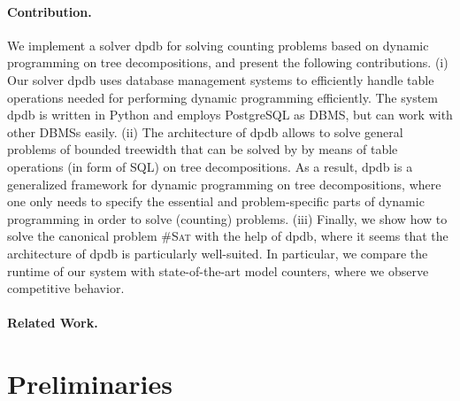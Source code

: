 \documentclass{llncs}
\newcommand{\cSAT}{\textsc{\#Sat}\xspace}%
\newcommand{\dpdb}{{\small\textsf{dpdb}}\xspace}
\begin{document}
\paragraph{Contribution.}  
We implement a solver \dpdb for solving counting problems based on dynamic programming on tree decompositions,
and present the following contributions.
(i) Our solver \dpdb uses database management systems to efficiently handle table operations needed
for performing dynamic programming efficiently. The system \dpdb is written in Python and employs PostgreSQL as DBMS,
but can work with other DBMSs easily.
(ii) The architecture of \dpdb allows to solve general problems of bounded treewidth that can be solved by
by means of table operations (in form of SQL) on tree decompositions. As a result, \dpdb is a generalized framework 
for dynamic programming on tree decompositions, where one only needs to specify the essential and problem-specific parts of dynamic programming
in order to solve (counting) problems.
(iii) Finally, we show how to solve the canonical problem \cSAT with the help of \dpdb, 
where it seems that the architecture of \dpdb
is particularly well-suited. In particular, we compare the runtime of
our system with state-of-the-art model counters, where we observe competitive behavior.
%

\paragraph{Related Work.} 


\section{Preliminaries}

\label{fig:prim1}%
\end{document}
